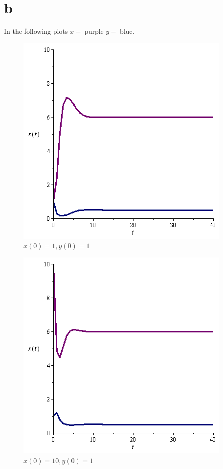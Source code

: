 \documentclass{unswmaths}
\begin{document}
\section*{b}
In the following plots $ x - $ purple $ y- $ blue.
\begin{figure}[H]
    \includegraphics[scale=0.5]{pp_1_1}
    \caption{$x(0)=1,y(0)=1$}
\end{figure}
\begin{figure}[H]
    \includegraphics[scale=0.5]{pp_10_1}
    \caption{$x(0)=10,y(0)=1$}
\end{figure}
\end{document}
